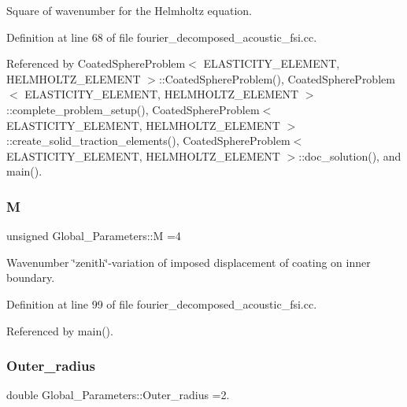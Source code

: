 Square of wavenumber for the Helmholtz equation. 



Definition at line 68 of file fourier\+\_\+decomposed\+\_\+acoustic\+\_\+fsi.\+cc.



Referenced by Coated\+Sphere\+Problem$<$ E\+L\+A\+S\+T\+I\+C\+I\+T\+Y\+\_\+\+E\+L\+E\+M\+E\+N\+T, H\+E\+L\+M\+H\+O\+L\+T\+Z\+\_\+\+E\+L\+E\+M\+E\+N\+T $>$\+::\+Coated\+Sphere\+Problem(), Coated\+Sphere\+Problem$<$ E\+L\+A\+S\+T\+I\+C\+I\+T\+Y\+\_\+\+E\+L\+E\+M\+E\+N\+T, H\+E\+L\+M\+H\+O\+L\+T\+Z\+\_\+\+E\+L\+E\+M\+E\+N\+T $>$\+::complete\+\_\+problem\+\_\+setup(), Coated\+Sphere\+Problem$<$ E\+L\+A\+S\+T\+I\+C\+I\+T\+Y\+\_\+\+E\+L\+E\+M\+E\+N\+T, H\+E\+L\+M\+H\+O\+L\+T\+Z\+\_\+\+E\+L\+E\+M\+E\+N\+T $>$\+::create\+\_\+solid\+\_\+traction\+\_\+elements(), Coated\+Sphere\+Problem$<$ E\+L\+A\+S\+T\+I\+C\+I\+T\+Y\+\_\+\+E\+L\+E\+M\+E\+N\+T, H\+E\+L\+M\+H\+O\+L\+T\+Z\+\_\+\+E\+L\+E\+M\+E\+N\+T $>$\+::doc\+\_\+solution(), and main().

\mbox{\label{namespaceGlobal__Parameters_abc67bb72ab99af013e3c7f6ffe453798}} 
\subsubsection{\texorpdfstring{M}{M}}
{\footnotesize\ttfamily unsigned Global\+\_\+\+Parameters\+::M =4}



Wavenumber \char`\"{}zenith\char`\"{}-\/variation of imposed displacement of coating on inner boundary. 



Definition at line 99 of file fourier\+\_\+decomposed\+\_\+acoustic\+\_\+fsi.\+cc.



Referenced by main().

\mbox{\label{namespaceGlobal__Parameters_a88ded445ecd7bd89701409e68fd0b900}} 
\subsubsection{\texorpdfstring{Outer\+\_\+radius}{Outer\_radius}}
{\footnotesize\ttfamily double Global\+\_\+\+Parameters\+::\+Outer\+\_\+radius =2.}



